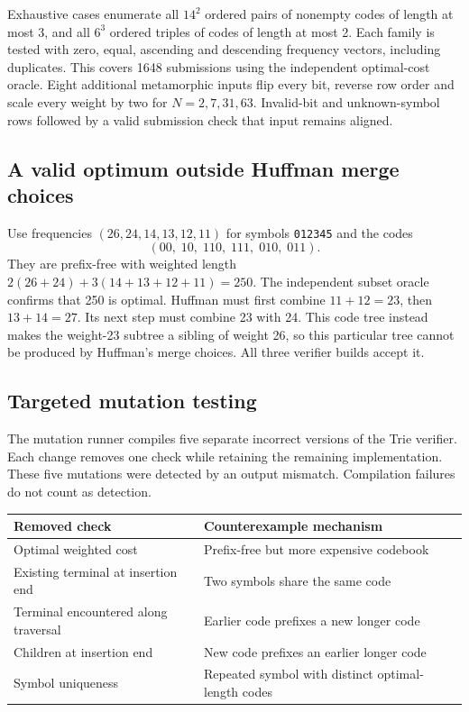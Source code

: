 \documentclass[11pt,a4paper]{article}
\begin{document}
Exhaustive cases enumerate all $14^2$ ordered pairs of nonempty codes of length at most 3, and all $6^3$ ordered triples of codes of length at most 2. Each family is tested with zero, equal, ascending and descending frequency vectors, including duplicates. This covers 1648 submissions using the independent optimal-cost oracle. Eight additional metamorphic inputs flip every bit, reverse row order and scale every weight by two for $N=2,7,31,63$. Invalid-bit and unknown-symbol rows followed by a valid submission check that input remains aligned.

\subsection*{A valid optimum outside Huffman merge choices}
Use frequencies $(26,24,14,13,12,11)$ for symbols \texttt{012345} and the codes
\[
(00,\;10,\;110,\;111,\;010,\;011).
\]
They are prefix-free with weighted length $2(26+24)+3(14+13+12+11)=250$. The independent subset oracle confirms that 250 is optimal. Huffman must first combine $11+12=23$, then $13+14=27$. Its next step must combine 23 with 24. This code tree instead makes the weight-23 subtree a sibling of weight 26, so this particular tree cannot be produced by Huffman's merge choices. All three verifier builds accept it.

\subsection*{Targeted mutation testing}
The mutation runner compiles five separate incorrect versions of the Trie verifier. Each change removes one check while retaining the remaining implementation. These five mutations were detected by an output mismatch. Compilation failures do not count as detection.

\begin{tabular}{@{}p{.43\linewidth}p{.48\linewidth}@{}}
\toprule
Removed check & Counterexample mechanism\\
\midrule
Optimal weighted cost & Prefix-free but more expensive codebook\\
Existing terminal at insertion end & Two symbols share the same code\\
Terminal encountered along traversal & Earlier code prefixes a new longer code\\
Children at insertion end & New code prefixes an earlier longer code\\
Symbol uniqueness & Repeated symbol with distinct optimal-length codes\\
\bottomrule
\end{tabular}
\end{document}
